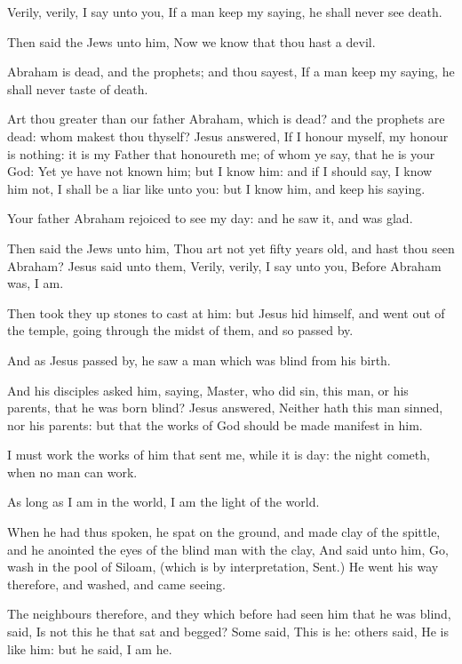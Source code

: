 \Verse Verily, verily, I say unto you, If a man keep my saying, he shall never see death.

\Verse Then said the Jews unto him, Now we know that thou hast a devil.

Abraham is dead, and the prophets; and thou sayest, If a man keep my saying, he shall never taste of death.

\Verse Art thou greater than our father Abraham, which is dead? and the prophets are dead: whom makest thou thyself?  \Verse Jesus answered, If I honour myself, my honour is nothing: it is my Father that honoureth me; of whom ye say, that he is your God: \Verse Yet ye have not known him; but I know him: and if I should say, I know him not, I shall be a liar like unto you: but I know him, and keep his saying.

\Verse Your father Abraham rejoiced to see my day: and he saw it, and was glad.

\Verse Then said the Jews unto him, Thou art not yet fifty years old, and hast thou seen Abraham?  \Verse Jesus said unto them, Verily, verily, I say unto you, Before Abraham was, I am.

\Verse Then took they up stones to cast at him: but Jesus hid himself, and went out of the temple, going through the midst of them, and so passed by.


\Chapter
\Verse And as Jesus passed by, he saw a man which was blind from his birth.

\Verse And his disciples asked him, saying, Master, who did sin, this man, or his parents, that he was born blind?  \Verse Jesus answered, Neither hath this man sinned, nor his parents: but that the works of God should be made manifest in him.

\Verse I must work the works of him that sent me, while it is day: the night cometh, when no man can work.

\Verse As long as I am in the world, I am the light of the world.

\Verse When he had thus spoken, he spat on the ground, and made clay of the spittle, and he anointed the eyes of the blind man with the clay, \Verse And said unto him, Go, wash in the pool of Siloam, (which is by interpretation, Sent.) He went his way therefore, and washed, and came seeing.

\Verse The neighbours therefore, and they which before had seen him that he was blind, said, Is not this he that sat and begged?  \Verse Some said, This is he: others said, He is like him: but he said, I am he.

